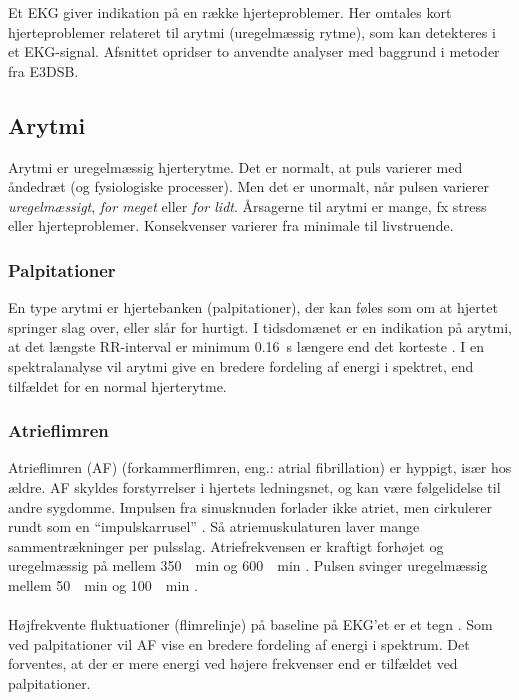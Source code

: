 \documentclass[a4paper]{report}
\begin{document}
        \begin{par}

Et EKG giver indikation på en række hjerteproblemer.
Her omtales kort hjerteproblemer relateret til arytmi (uregelmæssig rytme), som kan detekteres i et EKG-signal.
Afsnittet opridser to anvendte analyser med baggrund i metoder fra E3DSB.

\end{par} 
\begin{par}

\subsection{Arytmi}
Arytmi er uregelmæssig hjerterytme.
Det er normalt, at puls varierer med åndedræt (og fysiologiske processer).
Men det er unormalt, når pulsen varierer \textit{uregelmæssigt}, \textit{for meget} eller \textit{for lidt}.
Årsagerne til arytmi er mange, fx stress eller hjerteproblemer.
Konsekvenser varierer fra minimale til livstruende.

\end{par} 
\begin{par}

\subsubsection{Palpitationer}
En type arytmi er hjertebanken (palpitationer), der kan føles som om at hjertet springer slag over, eller slår for hurtigt.
I tidsdomænet er en indikation på arytmi, at det længste RR-interval er minimum \SI{0.16}{\second} længere end det korteste
\cite{st2prj2syg}\cite{bioelectric19}.
I en spektralanalyse vil arytmi give en bredere fordeling af energi i spektret, end tilfældet for en normal hjerterytme.

\end{par} 
\begin{par}

\subsubsection{Atrieflimren}
Atrieflimren (AF) (forkammerflimren, eng.: atrial fibrillation) er hyppigt, især hos ældre.
AF skyldes forstyrrelser i hjertets ledningsnet, og kan være følgelidelse til andre sygdomme.
Impulsen fra sinusknuden forlader ikke atriet, men cirkulerer rundt som en ``impulskarrusel'' \cite{absalonrytme}.
Så atriemuskulaturen laver mange sammentrækninger per pulsslag.
Atriefrekvensen er kraftigt forhøjet og uregelmæssig på mellem \SI{350}{\per\minute} og \SI{600}{\per\minute} \cite{atrieff}.
Pulsen svinger uregelmæssig mellem \SI{50}{\per\minute} og \SI{100}{\per\minute} \cite{absalonafli}.
\\ \\
Højfrekvente fluktuationer (flimrelinje) på baseline på EKG'et er et tegn \cite{absalonafli}.
Som ved palpitationer vil AF vise en bredere fordeling af energi i spektrum.
Det forventes, at der er mere energi ved højere frekvenser end er tilfældet ved palpitationer.

\end{par} 
\end{document}
